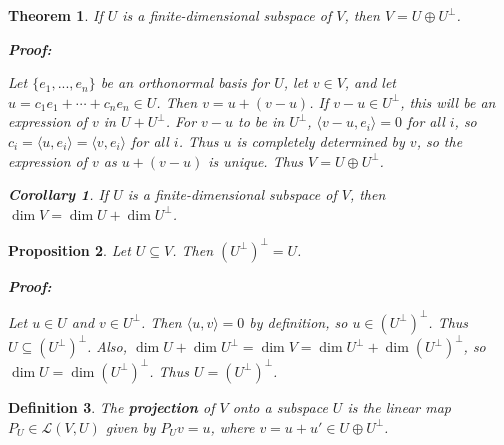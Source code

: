 \documentclass{article}
\theoremstyle{colontheorem}
\newtheorem{theorem}{Theorem}[section]
\newtheorem{proposition}[theorem]{Proposition}
\newtheorem{definition}[theorem]{Definition}
\newtheorem{corollary}{Corollary}[theorem]
\newenvironment{Theorem}
{
	\begin{mdframed}[backgroundcolor=TheoremOrange!10]
	\begin{theorem}
}
{
	\end{theorem}
	\end{mdframed}
	
	\vspace{.15in}
}
\newenvironment{Proposition}
{
	\begin{mdframed}[backgroundcolor=TheoremOrange!10]
	\begin{proposition}
}
{
	\end{proposition}
	\end{mdframed}
	
	\vspace{.15in}
}
\newenvironment{Def}
{
	\begin{mdframed}[backgroundcolor=DefGreen!10]
	\begin{definition}
}
{
	\end{definition}
	\end{mdframed}
	
	\vspace{.15in}
}
\newenvironment{Corollary}
{
	\begin{mdframed}[backgroundcolor=CorollaryBlue!10]
	\begin{corollary}
}
{
	\end{corollary}
	\end{mdframed}
	
	\vspace{.09in}
}
\newenvironment{Proof}
{
	\begin{mdframed}[backgroundcolor=ProofPurple!10]
	\textbf{Proof:}%
}
{
	\end{mdframed}
	
	\vspace{.085in}
}
\begin{document}
\begin{Theorem}
	
	If $U$ is a finite-dimensional subspace of $V$, then $V = U \oplus U^\perp$.
	
	\begin{Proof}
		Let $\{e_1, ..., e_n\}$ be an orthonormal basis for $U$, let $v \in V$, and let $u = c_1 e_1 + \cdots + c_n e_n \in U$. Then $v = u + (v - u)$. If $v - u \in U^\perp$, this will be an expression of $v$ in $U + U^\perp$. For $v - u$ to be in $U^\perp$, $\langle v-u, e_i \rangle = 0$ for all $i$, so $c_i = \langle u, e_i \rangle = \langle v, e_i \rangle$ for all $i$. Thus $u$ is completely determined by $v$, so the expression of $v$ as $u + (v - u)$ is unique. Thus $V = U \oplus U^\perp$.
		
	\end{Proof}
	
	\begin{Corollary}
		
		If $U$ is a finite-dimensional subspace of $V$, then $\dim V = \dim U + \dim U^\perp$.
		
	\end{Corollary}
	
\end{Theorem}



\begin{Proposition}
	
	Let $U \subseteq V$. Then $(U^\perp)^\perp = U$.
	
	\begin{Proof}
		Let $u \in U$ and $v \in U^\perp$. Then $\langle u, v \rangle = 0$ by definition, so $u \in (U^\perp)^\perp$. Thus $U \subseteq (U^\perp)^\perp$. Also, $\dim U + \dim U^\perp = \dim V = \dim U^\perp + \dim (U^\perp)^\perp$, so $\dim U = \dim (U^\perp)^\perp$. Thus $U = (U^\perp)^\perp$.
		
	\end{Proof}
	
\end{Proposition}



\begin{Def}
	
	The \textbf{projection} of $V$ onto a subspace $U$ is the linear map $P_U \in \mathcal{L}(V, U)$ given by $P_U v = u$, where $v = u + u' \in U \oplus U^\perp$.
	
\end{Def}
\end{document}
